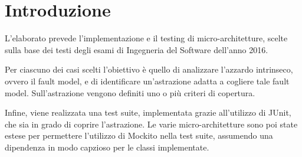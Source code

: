 \section{Introduzione}

L'elaborato prevede l'implementazione e il testing di micro-architetture, scelte sulla base dei testi degli esami di Ingegneria del Software dell'anno 2016.

Per ciascuno dei casi scelti l'obiettivo è quello di analizzare l'azzardo intrinseco, ovvero il fault model, e di identificare un'astrazione adatta a cogliere tale fault model. Sull'astrazione vengono definiti uno o più criteri di copertura.

Infine, viene realizzata una test suite, implementata grazie all'utilizzo di JUnit, che sia in grado di coprire l'astrazione. 
Le varie micro-architetture sono poi state estese per permettere l'utilizzo di Mockito nella test suite, assumendo una dipendenza in modo capzioso per le classi implementate.